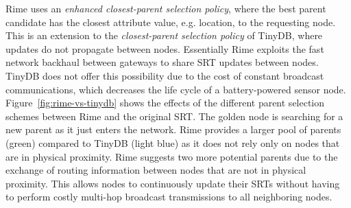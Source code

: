 Rime uses an \textit{enhanced closest-parent selection policy}, where the best parent candidate 
has the closest attribute value, e.g. location, to the requesting node. This is an extension to
the \textit{closest-parent selection policy} of TinyDB, where updates do not propagate between nodes. 
Essentially Rime exploits the fast network backhaul between gateways to share SRT updates between nodes. 
TinyDB does not offer this possibility due to the cost of constant broadcast communications,
which decreases the life cycle of a battery-powered sensor node.
Figure~\ref{fig:rime-vs-tinydb} shows the effects of the different parent selection schemes
between Rime and the original SRT.
The golden node is searching
for a new parent as it just enters the network. Rime provides
a larger pool of parents (green) compared to TinyDB (light blue) as it does not rely only on
nodes that are in physical proximity.
Rime suggests two more potential parents due to the 
exchange of routing information
between nodes that are not in physical proximity. This allows nodes to
continuously update their SRTs without having to perform costly multi-hop broadcast transmissions
to all neighboring nodes.
%

